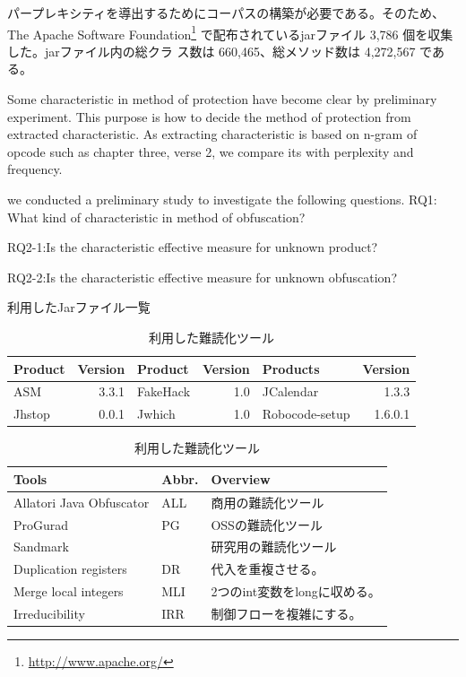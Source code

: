 \documentclass[conference]{IEEEtran}
\begin{document}
パープレキシティを導出するためにコーパスの構築が必要である。そのため、
The Apache Software Foundation\footnote{\url{http://www.apache.org/}}
で配布されているjarファイル 3,786 個を収集した。jarファイル内の総クラ
ス数は 660,465、総メソッド数は 4,272,567 である。

Some characteristic in method of protection have become clear by
preliminary experiment.  This purpose is how to decide the method of
protection from extracted characteristic.  As extracting
characteristic is based on n-gram of opcode such as chapter three,
verse 2, we compare its with perplexity and frequency.

we conducted a preliminary study to investigate the following
questions.  RQ1: What kind of characteristic in method of obfuscation?

RQ2-1:Is the characteristic effective measure for unknown product?

RQ2-2:Is the characteristic effective measure for unknown obfuscation?

\begin{table}[t]
  \centering
  \footnotesize{
    \caption{利用したJarファイル一覧}\label{table:jars}
  \begin{tabular}{l|r||l|r||l|r}
    Product & Version & Product & Version & Products & Version \\ \hline
    ASM       & 3.3.1 & FakeHack  & 1.0 &JCalendar & 1.3.3   \\
    Jhstop    & 0.0.1 & Jwhich    & 1.0   & Robocode-setup & 1.6.0.1 
  \end{tabular}
  \caption{利用した難読化ツール}\label{table:tools}
  \begin{tabular}{ll|l}
      Tools & Abbr. & Overview \\ \hline
      Allatori Java Obfuscator & ALL & 商用の難読化ツール \\ \hline
      ProGurad                 & PG & OSSの難読化ツール \\ \hline
      Sandmark                 & & 研究用の難読化ツール \\
      \hspace{0.2cm} Duplication registers & DR & 代入を重複させる。\\
      \hspace{0.2cm} Merge local integers & MLI & 2つのint変数をlongに収める。\\
      \hspace{0.2cm} Irreducibility       & IRR & 制御フローを複雑にする。\\
  \end{tabular}}
\end{table}
\end{document}
